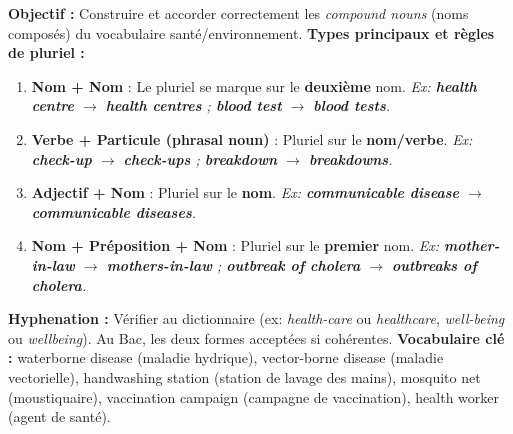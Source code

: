\documentclass[11pt]{article}
\newcommand{\cle}[1]{{\popxbold\color{popdark}#1}}
\begin{document}
\begin{methode}
\textbf{Objectif :} Construire et accorder correctement les \emph{compound nouns} (noms composés) du vocabulaire santé/environnement.
\medskip
\textbf{Types principaux et règles de pluriel :}
\begin{enumerate}
    \item \textbf{Nom + Nom} : Le pluriel se marque sur le \textbf{deuxième} nom. \textit{Ex: \textbf{health centre} $\rightarrow$ \textbf{health centres} ; \textbf{blood test} $\rightarrow$ \textbf{blood tests}.}
    \item \textbf{Verbe + Particule (phrasal noun)} : Pluriel sur le \textbf{nom/verbe}. \textit{Ex: \textbf{check-up} $\rightarrow$ \textbf{check-ups} ; \textbf{breakdown} $\rightarrow$ \textbf{breakdowns}.}
    \item \textbf{Adjectif + Nom} : Pluriel sur le \textbf{nom}. \textit{Ex: \textbf{communicable disease} $\rightarrow$ \textbf{communicable diseases}.}
    \item \textbf{Nom + Préposition + Nom} : Pluriel sur le \textbf{premier} nom. \textit{Ex: \textbf{mother-in-law} $\rightarrow$ \textbf{mothers-in-law} ; \textbf{outbreak of cholera} $\rightarrow$ \textbf{outbreaks of cholera}.}
\end{enumerate}
\textbf{Hyphenation :} Vérifier au dictionnaire (ex: \emph{health-care} ou \emph{healthcare}, \emph{well-being} ou \emph{wellbeing}). Au Bac, les deux formes acceptées si cohérentes.
\textbf{Vocabulaire clé :} \cle{waterborne disease} (maladie hydrique), \cle{vector-borne disease} (maladie vectorielle), \cle{handwashing station} (station de lavage des mains), \cle{mosquito net} (moustiquaire), \cle{vaccination campaign} (campagne de vaccination), \cle{health worker} (agent de santé).
\end{methode}
\end{document}

